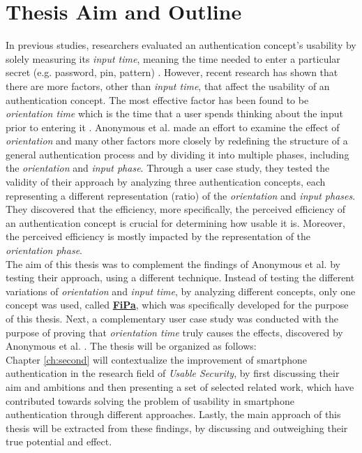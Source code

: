 \section{Thesis Aim and Outline}

In previous studies, researchers evaluated an authentication concept's usability by solely measuring its \textit{input time}, meaning the time needed to enter a particular secret (e.g. password, pin, pattern) \cite{anonymous}.
However, recent research has shown that there are more factors, other than \textit{input time}, that affect the usability of an authentication concept. The most effective factor has been found to be \textit{orientation time} which is the time that a user spends thinking about the input prior to entering it \cite{anonymous}. Anonymous et al. \cite{anonymous} made an effort to examine the effect of \textit{orientation} and many other factors more closely by redefining the structure of a general authentication process and by dividing it into multiple phases, including the \textit{orientation} and \textit{input phase}. Through a user case study, they tested the validity of their approach by analyzing three authentication concepts, each representing a different representation (ratio) of the \textit{orientation} and \textit{input phases}. They discovered that the efficiency, more specifically, the perceived efficiency of an authentication concept is crucial for determining how usable it is. Moreover, the perceived efficiency is mostly impacted by the representation of the \textit{orientation phase}. \\

The aim of this thesis was to complement the findings of Anonymous et al. \cite{anonymous} by testing their approach, using a different technique. Instead of testing the different variations of \textit{orientation} and \textit{input time}, by analyzing different concepts, only one concept was used, called \underline{\textbf{FiPa}}, which was specifically developed for the purpose of this thesis. Next, a complementary user case study was conducted with the purpose of proving that \textit{orientation time} truly causes the effects, discovered by Anonymous et al. \cite{anonymous}. The thesis will be organized as follows: \\

Chapter \ref{ch:second} will contextualize the improvement of smartphone authentication in the research field of \textit{Usable Security}, by first discussing their aim and ambitions and then presenting a set of selected related work, which have contributed towards solving the problem of usability in smartphone authentication through different approaches. Lastly, the main approach of this thesis will be extracted from these findings, by discussing and outweighing their true potential and effect. \\

